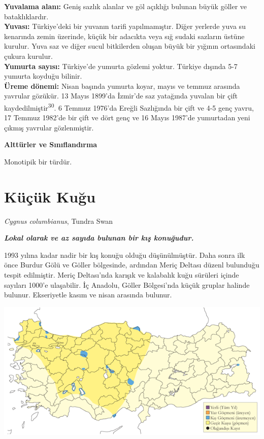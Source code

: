 \documentclass[
  letterpaper,
  DIV=11,
  numbers=noendperiod]{scrreprt}
\begin{document}
\textbf{Yuvalama alanı:} Geniş sazlık alanlar ve göl açıklığı bulunan
büyük göller ve bataklıklardır.\\
\textbf{Yuvası:} Türkiye'deki bir yuvanın tarifi yapılmamıştır. Diğer
yerlerde yuva su kenarında zemin üzerinde, küçük bir adacıkta veya sığ
sudaki sazların üstüne kurulur. Yuva saz ve diğer sucul bitkilerden
oluşan büyük bir yığının ortasındaki çukura kurulur.\\
\textbf{Yumurta sayısı:} Türkiye'de yumurta gözlemi yoktur. Türkiye
dışında 5-7 yumurta koyduğu bilinir.\\
\textbf{Üreme dönemi:} Nisan başında yumurta koyar, mayıs ve temmuz
arasında yavrular gözükür. 13 Mayıs 1899'da İzmir'de saz yatağında
yuvalan bir çift kaydedilmiştir\textsuperscript{30}. 6 Temmuz 1976'da
Ereğli Sazlığında bir çift ve 4-5 genç yavru, 17 Temmuz 1982'de bir çift
ve dört genç ve 16 Mayıs 1987'de yumurtadan yeni çıkmış yavrular
gözlenmiştir.

\textbf{Alttürler ve Sınıflandırma}

Monotipik bir türdür.

\hypertarget{kuxfcuxe7uxfck-kuux11fu}{%
\section{Küçük Kuğu}\label{kuxfcuxe7uxfck-kuux11fu}}

\emph{Cygnus columbianus}, Tundra Swan

\textbf{\emph{Lokal olarak ve az sayıda bulunan bir kış konuğudur.}}

1993 yılına kadar nadir bir kış konuğu olduğu düşünülmüştür. Daha sonra
ilk önce Burdur Gölü ve Göller bölgesinde, ardından Meriç Deltası düzenl
bulunduğu tespit edilmiştir. Meriç Deltası'nda karışık ve kalabalık kuğu
sürüleri içinde sayıları 1000'e ulaşabilir. İç Anadolu, Göller
Bölgesi'nda küçük gruplar halinde bulunur. Ekseriyetle kasım ve nisan
arasında bulunur.

\includegraphics{images/harita_Page_009.png}
\end{document}
